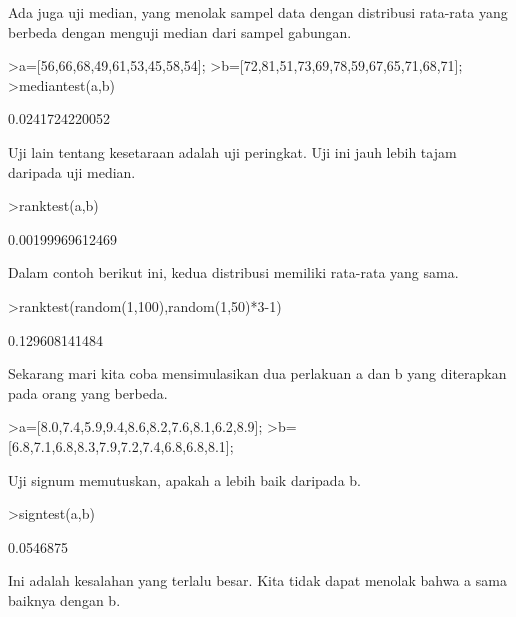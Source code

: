 \documentclass[a4paper,10pt]{article}
\begin{document}
\begin{eulernotebook}
\begin{eulercomment}
\begin{eulercomment}
\begin{eulercomment}
\begin{eulercomment}
\begin{eulercomment}
Ada juga uji median, yang menolak sampel data dengan distribusi
rata-rata yang berbeda dengan menguji median dari sampel gabungan.
\end{eulercomment}
\begin{eulerprompt}
>a=[56,66,68,49,61,53,45,58,54];
>b=[72,81,51,73,69,78,59,67,65,71,68,71];
>mediantest(a,b)
\end{eulerprompt}
\begin{euleroutput}
  0.0241724220052
\end{euleroutput}
\begin{eulercomment}
Uji lain tentang kesetaraan adalah uji peringkat. Uji ini jauh lebih
tajam daripada uji median.
\end{eulercomment}
\begin{eulerprompt}
>ranktest(a,b)
\end{eulerprompt}
\begin{euleroutput}
  0.00199969612469
\end{euleroutput}
\begin{eulercomment}
Dalam contoh berikut ini, kedua distribusi memiliki rata-rata yang
sama.
\end{eulercomment}
\begin{eulerprompt}
>ranktest(random(1,100),random(1,50)*3-1)
\end{eulerprompt}
\begin{euleroutput}
  0.129608141484
\end{euleroutput}
\begin{eulercomment}
Sekarang mari kita coba mensimulasikan dua perlakuan a dan b yang
diterapkan pada orang yang berbeda.
\end{eulercomment}
\begin{eulerprompt}
>a=[8.0,7.4,5.9,9.4,8.6,8.2,7.6,8.1,6.2,8.9];
>b=[6.8,7.1,6.8,8.3,7.9,7.2,7.4,6.8,6.8,8.1];
\end{eulerprompt}
\begin{eulercomment}
Uji signum memutuskan, apakah a lebih baik daripada b.
\end{eulercomment}
\begin{eulerprompt}
>signtest(a,b)
\end{eulerprompt}
\begin{euleroutput}
  0.0546875
\end{euleroutput}
\begin{eulercomment}
Ini adalah kesalahan yang terlalu besar. Kita tidak dapat menolak
bahwa a sama baiknya dengan b.


\end{eulercomment}
\end{eulercomment}
\end{eulercomment}
\end{eulercomment}
\end{eulercomment}
\end{eulernotebook}
\end{document}
